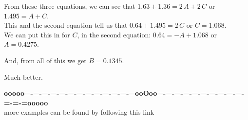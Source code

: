 \documentclass{ximera}
\begin{document}
From these three equations, we can see that $1.63 + 1.36 = 2 \, A + 2 \, C$   or $1.495 = A + C$.  \\

This and the second equation tell us that $0.64 + 1.495 = 2 \, C$ or $C = 1.068$. \\

We can put this in for $C$, in the second equation: $0.64 = -A + 1.068$ or $A = 0.4275$.

And, from all of this we get $B = 0.1345$.






\begin{center}
\end{center}

Much better.















\begin{center}
\textbf{\textcolor{green!50!black}{ooooo=-=-=-=-=-=-=-=-=-=-=-=-=ooOoo=-=-=-=-=-=-=-=-=-=-=-=-=ooooo}} \\

more examples can be found by following this link\\ 

\end{center}
\end{document}
